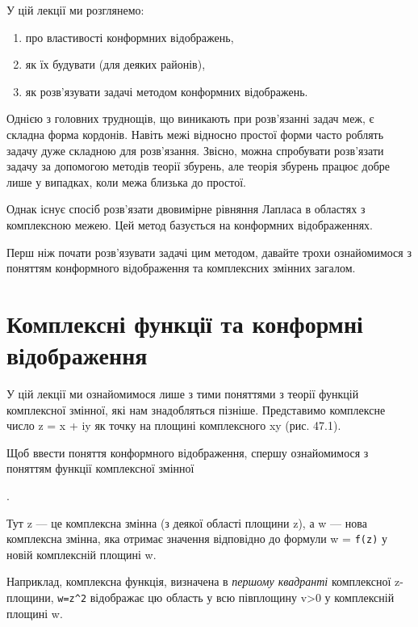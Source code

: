 \documentclass[
  ukrainian,
]{article}
\begin{document}
У цій лекції ми розглянемо:

\begin{enumerate}
\def\labelenumi{\arabic{enumi})}
\item
  про властивості конформних відображень,
\item
  як їх будувати (для деяких районів),
\item
  як розв'язувати задачі методом конформних відображень.
\end{enumerate}

Однією з головних труднощів, що виникають при розв'язанні задач меж, є
складна форма кордонів. Навіть межі відносно простої форми часто роблять
задачу дуже складною для розв'язання. Звісно, можна спробувати
розв'язати задачу за допомогою методів теорії збурень, але теорія
збурень працює добре лише у випадках, коли межа близька до простої.

Однак існує спосіб розв'язати двовимірне рівняння Лапласа в областях з
комплексною межею. Цей метод базується на конформних відображеннях.

Перш ніж почати розв'язувати задачі цим методом, давайте трохи
ознайомимося з поняттям конформного відображення та комплексних змінних
загалом.

\section{Комплексні функції та конформні
відображення}\label{ux43aux43eux43cux43fux43bux435ux43aux441ux43dux456-ux444ux443ux43dux43aux446ux456ux457-ux442ux430-ux43aux43eux43dux444ux43eux440ux43cux43dux456-ux432ux456ux434ux43eux431ux440ux430ux436ux435ux43dux43dux44f}

У цій лекції ми ознайомимося лише з тими поняттями з теорії функцій
комплексної змінної, які нам знадобляться пізніше. Представимо
комплексне число z = x + iy як точку на площині комплексного xy (рис.
47.1).

Щоб ввести поняття конформного відображення, спершу ознайомимося з
поняттям функції комплексної змінної

.

Тут z --- це комплексна змінна (з деякої області площини z), а w ---
нова комплексна змінна, яка отримає значення відповідно до формули w =
\texttt{f(z)} у новій комплексній площині w.

Наприклад, комплексна функція, визначена в \emph{першому квадранті}
комплексної z-площини, \texttt{w=z\^{}2} відображає цю область у всю
півплощину v\textgreater0 у комплексній площині w.
\end{document}

